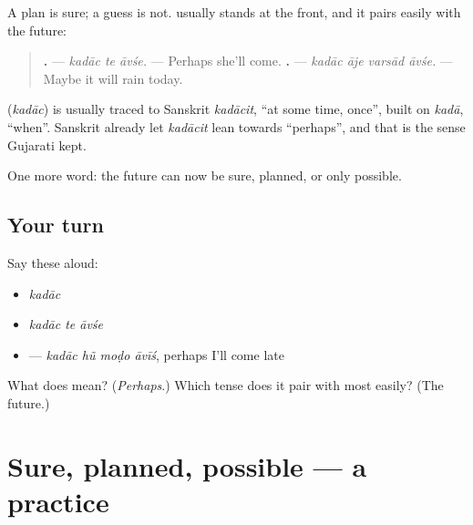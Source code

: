 A plan is sure; a guess is not. \textbf{} usually stands at the front, and it pairs easily with the future:

\begin{quote}
\textbf{  .} — \emph{kadāc te āvśe.} — Perhaps she'll come. \textbf{   .} — \emph{kadāc āje varsād āvśe.} — Maybe it will rain today.
\end{quote}

\begin{cousinweb}
\textbf{} (\emph{kadāc}) is usually traced to Sanskrit \emph{kadācit}, \textquotedblleft{}at some time, once\textquotedblright{}, built on \emph{kadā}, \textquotedblleft{}when\textquotedblright{}. Sanskrit already let \emph{kadācit} lean towards \textquotedblleft{}perhaps\textquotedblright{}, and that is the sense Gujarati kept.
\end{cousinweb}

\begin{grammarlens}[title={What you've built}]
One more word: the future can now be sure, planned, or only possible.
\end{grammarlens}

\subsection*{Your turn}
Say these aloud:

\begin{itemize}
\raggedright
  \item \emph{kadāc}
  \item \emph{kadāc te āvśe}
  \item \textbf{   } — \emph{kadāc hũ moḍo āvīś}, perhaps I'll come late
\end{itemize}

\begin{tcolorbox}[breakable,colback=teal!4,colframe=teal!35!black,title={Before you move on}]
What does \textbf{} mean? (\emph{Perhaps}.) Which tense does it pair with most easily? (The future.)
\end{tcolorbox}
\section[Practice]{Sure, planned, possible — a practice}

\label{lesson:GU-C150-plans-practice}



